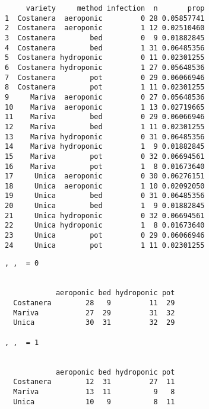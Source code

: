 \documentclass[
  letterpaper,
  DIV=11,
  numbers=noendperiod]{scrartcl}
\newenvironment{Shaded}{\begin{snugshade}}{\end{snugshade}}
\newcommand{\FunctionTok}[1]{\textcolor[rgb]{0.28,0.35,0.67}{#1}}
\newcommand{\NormalTok}[1]{\textcolor[rgb]{0.00,0.23,0.31}{#1}}
\newcommand{\SpecialCharTok}[1]{\textcolor[rgb]{0.37,0.37,0.37}{#1}}
\begin{document}
\begin{verbatim}
     variety     method infection  n       prop
1  Costanera  aeroponic         0 28 0.05857741
2  Costanera  aeroponic         1 12 0.02510460
3  Costanera        bed         0  9 0.01882845
4  Costanera        bed         1 31 0.06485356
5  Costanera hydroponic         0 11 0.02301255
6  Costanera hydroponic         1 27 0.05648536
7  Costanera        pot         0 29 0.06066946
8  Costanera        pot         1 11 0.02301255
9     Mariva  aeroponic         0 27 0.05648536
10    Mariva  aeroponic         1 13 0.02719665
11    Mariva        bed         0 29 0.06066946
12    Mariva        bed         1 11 0.02301255
13    Mariva hydroponic         0 31 0.06485356
14    Mariva hydroponic         1  9 0.01882845
15    Mariva        pot         0 32 0.06694561
16    Mariva        pot         1  8 0.01673640
17     Unica  aeroponic         0 30 0.06276151
18     Unica  aeroponic         1 10 0.02092050
19     Unica        bed         0 31 0.06485356
20     Unica        bed         1  9 0.01882845
21     Unica hydroponic         0 32 0.06694561
22     Unica hydroponic         1  8 0.01673640
23     Unica        pot         0 29 0.06066946
24     Unica        pot         1 11 0.02301255
\end{verbatim}

\begin{Shaded}
\end{Shaded}

\begin{verbatim}
, ,  = 0

           
            aeroponic bed hydroponic pot
  Costanera        28   9         11  29
  Mariva           27  29         31  32
  Unica            30  31         32  29

, ,  = 1

           
            aeroponic bed hydroponic pot
  Costanera        12  31         27  11
  Mariva           13  11          9   8
  Unica            10   9          8  11
\end{verbatim}

\begin{Shaded}
\end{Shaded}
\end{document}
